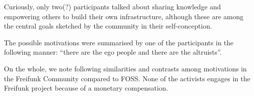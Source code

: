 Curiously, only two(?) participants talked about sharing knowledge and empowering others to build their own infrastructure, although these are among the central goals sketched by the community in their self-conception\cite{ffweb}.

The possible motivations were summarised by one of the participants in the following manner: ``there are the ego people and there are the altruists''.

On the whole, we note following similarities and contrasts among motivations in the Freifunk Community compared to FOSS.
None of the activists engages in the Freifunk project because of a monetary compensation.


\begin{comment}
  ## Spannend (Manche zusammengefasste Beobachtungen):

* Nicht alle verstehen das selbe unter Netzneutralität und nicht alle erachten das als wichtig (je nach Verständnis)
* (initielle) Mitmachmotivationen verschiedener Generationen werden sichtbar:
  ** Menschen, die vor 2008 angefangen haben: Probleme mit (schnellem) Internetzugang bekommen, man nimmt das in die eigenen Hände
  ** Menschen, die später angefangen haben: eher aus Interesse an Netzwerktechnik/ finden die polit. Idee gut
* mehrere sprechen den Community-Aspect an: also die Möglichkeit gemeinsam ein Projekt aufzubauen, interessante Menschen kennen zu lernen, "aus dem eigenen Dunst rauskommen"
* nicht viele Menschen sprechen die Idee an, das eigene Wissen zu teilen (auch wenn es eine der Zentralthemen in der Selbstdarstellung vom Projekt ist)
* "es gibt die Ego-Leute und es gibt die Altruisten"


##  Gemeinsamkeiten/Unterschiede in den Motivationen

* niemand macht Freifunk, weil er_sie dafür bezahlt wird
* (fast) niemand nimmt am Projekt teil, weil er_sie sich davon bessere Kontakte/Jobchancen verspricht (wird eher als Nebenprodukt gesehen) (an FOSS dagegen angeblich schon)
* sowohl bei FOSS als auch bei Freifunk gibt es Menschen, die aus persönlichen Bedürfnissen teilnehmen ("Ich hatte kein Netz" / "Ich brauchte das Feature XY")
* auch wenn mir unklar ist, wie ich Altruismus messen sollte, scheinen bei Freifunk die Mehrheit der Menschen von der politischen Idee einer dezentralen autonomen Kommunikationsinfrastruktur bewegt zu werden
* Communitybildung/-zugehörigkeit wichtig
* ein Großteil der Menschen findet die Beschäftigung mit Netzwerken spannend
* einige wollen ihre Netzwerkkenntnisse und -fähigkeiten ausbauen, scheint aber nicht so in Fokus zu sein (dagegen bei FOSS eher)

---

Die Papers beschäftigen sich (vor allem) mit der Motivation von Entwickler*innen. Allerdings gibt es auch andere Möglichkeiten zu beiden Communities beizutragen (user documentation, publicity, design, Übersetzung, ...). Kann man sich da andere Motivationen vorstellen?
\end{comment}

